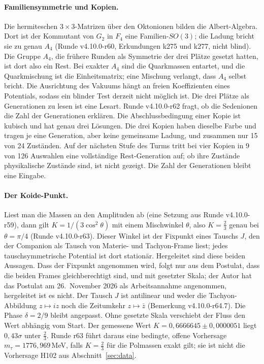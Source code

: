 \paragraph{Familiensymmetrie und Kopien.}
Die hermiteschen \(3\times3\)-Matrizen über den Oktonionen bilden die Albert-Algebra. Dort ist der Kommutant von \(G_2\) in
\(F_4\) eine Familien-\(SO(3)\); die Ladung bricht sie zu genau \(A_4\) (Runde v4.10.0-r60, Erkundungen k275 und k277, nicht blind). Die Gruppe \(A_4\),
die frühere Runden als Symmetrie der drei Plätze gesetzt hatten, ist dort also ein Rest. Bei exakter \(A_4\) sind die Quarkmassen entartet,
und die Quarkmischung ist die Einheitsmatrix; eine Mischung verlangt, dass \(A_4\) selbst bricht. Die Ausrichtung des Vakuums hängt an freien
Koeffizienten eines Potentials, sodass ein blinder Test derzeit nicht möglich ist. Die drei Plätze als Generationen zu lesen ist eine Lesart.
Runde v4.10.0-r62 fragt, ob die Sedenionen die Zahl der Generationen erklären. Die Abschlussbedingung einer Kopie ist kubisch und hat genau
drei Lösungen. Die drei Kopien haben dieselbe Farbe und tragen je eine Generation, aber keine gemeinsame Ladung, und zusammen nur 15 von 24
Zuständen. Auf der nächsten Stufe des Turms tritt bei vier Kopien in 9 von 126 Auswahlen eine vollständige Rest-Generation auf; ob ihre
Zustände physikalische Zustände sind, ist nicht gezeigt. Die Zahl der Generationen bleibt eine Eingabe.

\paragraph{Der Koide-Punkt.}
Liest man die Massen an den Amplituden ab (eine Setzung aus Runde v4.10.0-r59), dann gilt \(K=1/(3\cos^2\theta)\) mit einem Mischwinkel
\(\theta\), also \(K=\tfrac23\) genau bei \(\theta=\pi/4\) (Runde v4.10.0-r63). Dieser Winkel ist der Fixpunkt eines Tauschs \(J\), den der
Companion als Tausch von Materie- und Tachyon-Frame liest; jedes tauschsymmetrische Potential ist dort stationär. Hergeleitet sind diese
beiden Aussagen. Dass der Fixpunkt angenommen wird, folgt nur aus dem Postulat, dass die beiden Frames gleichberechtigt sind, und mit
gesetzter Skala; der Autor hat das Postulat am 26.~November 2026 als Arbeitsannahme angenommen, hergeleitet ist es nicht. Der Tausch \(J\)
ist antilinear und weder die Tachyon-Abbildung \(z\mapsto iz\) noch die Zeitumkehr \(z\mapsto\bar z\) (Bemerkung v4.10.0-r64.7). Die Phase
\(\delta=2/9\) bleibt angepasst. Ohne gesetzte Skala verschiebt der Fluss den Wert abhängig vom Start. Der gemessene Wert
\(K=0{,}6666645\pm0{,}0000051\) liegt \(0{,}43\sigma\) unter \(\tfrac23\). Runde r63 führt daraus eine bedingte, offene Vorhersage
\(m_\tau=1776{,}969\)\,MeV, falls \(K=\tfrac23\) für die Polmassen exakt gilt; sie ist nicht die Vorhersage H102 aus
Abschnitt~\ref{sec:data}.

